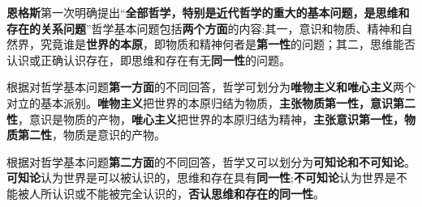 \textbf{{恩格斯}}第一次明确提出``\textbf{{{全部哲学，特别是近代哲学的重大的基本问题，是思维和存在的关系问题}}}''哲学基本问题包括\textbf{{{两个方面}}}的内容:其一，意识和物质、精神和自然界，究竟谁是\textbf{{{世界的本原}}}，即物质和精神何者是\textbf{{{第一性}}}的问题；其二，思维能否认识或正确认识存在，即思维和存在有无\textbf{{{同一性}}}的问题。

根据对哲学基本问题\textbf{{{第一方面}}}的不同回答，哲学可划分为\textbf{{{唯物主义和唯心主义}}}两个对立的基本派别{。}\textbf{{{唯物主义}}}把世界的本原归结为物质，\textbf{{{主张物质第一性，意识第二性}}}，意识是物质的产物，\textbf{{{唯心主义}}}把世界的本原归结为精神，\textbf{{{主张意识第一性，物质第二性}}}，物质是意识的产物。

{根据对哲学基本问题}\textbf{{{第二方面}}}{的不同回答，哲学又可以划分为}\textbf{{可知论和不可知论}}{。}\textbf{{可知论}}{认为世界是可以被认识的，思维和存在具有}\textbf{{同一性}}{;}\textbf{{不可知论}}{认为世界是不能被人所认识或不能被完全认识的，}\textbf{{否认思维和存在的同一性}}{。}
